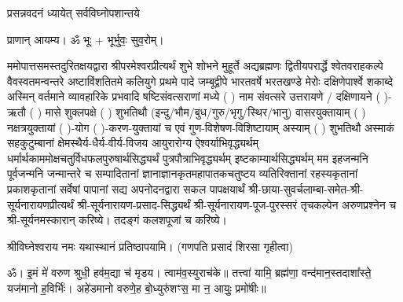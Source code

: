 
\setlength{\parindent}{0pt}





{प्रसन्नवदनं ध्यायेत् सर्वविघ्नोपशान्तये}
 
प्राणान्  आयम्य।  ॐ भूः + भूर्भुवः॒ सुव॒रोम्।


ममोपात्तसमस्तदुरितक्षयद्वारा श्रीपरमेश्वरप्रीत्यर्थं शुभे शोभने मुहूर्ते अद्यब्रह्मणः
द्वितीयपरार्द्धे श्वेतवराहकल्पे वैवस्वतमन्वन्तरे अष्टाविंशतितमे कलियुगे प्रथमे पादे
जम्बूद्वीपे भारतवर्षे भरतखण्डे मेरोः दक्षिणेपार्श्वे शकाब्दे अस्मिन् वर्तमाने व्यावहारिके
प्रभवादि षष्टिसंवत्सराणां मध्ये (	) नाम संवत्सरे उत्तरायणे / दक्षिणायने  (  )-ऋतौ  (  ) मासे 
शुक्लपक्षे (  ) शुभतिथौ (इन्दु/भौम/बुध/गुरु/भृगु/स्थिर/भानु) वासरयुक्तायाम्
(  ) नक्षत्रयुक्तायां (  )-योग (  )-करण-युक्तायां च एवं गुण-विशेषण-विशिष्टायाम्
अस्याम् (  ) शुभतिथौ अस्माकं सहकुटुम्बानां क्षेमस्थैर्य-धैर्य-वीर्य-विजय आयुरारोग्य ऐश्वर्याभिवृद्ध्यर्थम्
 धर्मार्थकाममोक्ष\-चतुर्विधफलपुरुषार्थसिद्ध्यर्थं पुत्रपौत्राभिवृद्ध्यर्थम् इष्टकाम्यार्थसिद्ध्यर्थम्
मम इहजन्मनि पूर्वजन्मनि जन्मान्तरे च सम्पादितानां ज्ञानाज्ञानकृतमहा\-पातकचतुष्टय
व्यतिरिक्तानां रहस्यकृतानां प्रकाशकृतानां सर्वेषां पापानां सद्य अपनोदनद्वारा सकल 
पापक्षयार्थं 
श्री-छाया-सुवर्चलाम्बा-समेत-श्री-सूर्यनारायणप्रीत्यर्थं
श्री-सूर्यनारायण-प्रसाद-सिद्ध्यर्थं श्री-सूर्यनारायण-पूज-पुरस्सरं तृचकल्पेन अरुणप्रश्नेन च श्री-सूर्यनमस्कारान् 
करिष्ये। तदङ्गं कलशपूजां च करिष्ये।


श्रीविघ्नेश्वराय नमः यथास्थानं प्रतिष्ठापयामि।
(गणपति प्रसादं शिरसा गृहीत्वा)












 

ॐ। इ॒मं मे॑ वरुण श्रुधी॒ हव॑म॒द्या च॑ मृडय। त्वाम॑व॒स्युराच॑के॥ तत्त्वा॑ यामि॒ ब्रह्म॑णा॒ वन्द॑मान॒स्तदाशा᳚स्ते॒ यज॑मानो ह॒विर्भिः॑। अहे॑डमानो वरुणे॒ह बो॒ध्युरु॑शꣳस॒ मा न॒ आयुः॒ प्रमो॑षीः॥

